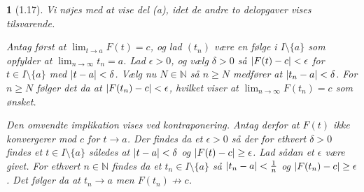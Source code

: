 \documentclass[a4paper, 11pt, article, danish, oneside]{memoir}
\newcommand{\naturals}{\mathbb{N}}
\newcommand{\blank}{\mathrel{\;\cdot\;}}
\newcommand{\blankifempty}[1]{\ifstrempty{#1}{\blank}{#1}}
\DeclarePairedDelimiter{\auxdelimlvert}{\lvert}{\rvert}
\newcommand{\abs}[1]{\auxdelimlvert{\blankifempty{#1}}}
\newcommand{\pencilsymbol}{\raisebox{-2pt}{\normalfont\PencilLeft}}
\theoremstyle{changedotcustomnumber}
\newtheorem{opgave}{\pencilsymbol}
\theoremstyle{changedotbreakcustomnumber}
\begin{document}
\begin{opgave}[1.17]
    Vi nøjes med at vise del (a), idet de andre to delopgaver vises tilsvarende.

    Antag først at $\lim_{t \to a} F(t) = c$, og lad $(t_n)$ være en følge i $I \setminus \{a\}$ som opfylder at $\lim_{n \to \infty} t_n = a$. Lad $\epsilon > 0$, og vælg $\delta > 0$ så $\abs{F(t) - c} < \epsilon$ for $t \in I \setminus \{a\}$ med $\abs{t - a} < \delta$. Vælg nu $N \in \naturals$ så $n \geq N$ medfører at $\abs{t_n - a} < \delta$. For $n \geq N$ følger det da at $\abs{F(t_n) - c} < \epsilon$, hvilket viser at $\lim_{n \to \infty} F(t_n) = c$ som ønsket.

    Den omvendte implikation vises ved kontraponering. Antag derfor at $F(t)$ \emph{ikke} konvergerer mod $c$ for $t \to a$. Der findes da et $\epsilon > 0$ så der for ethvert $\delta > 0$ findes et $t \in I \setminus \{a\}$ således at $\abs{t - a} < \delta$ og $\abs{F(t) - c} \geq \epsilon$. Lad sådan et $\epsilon$ være givet. For ethvert $n \in \naturals$ findes da et $t_n \in I \setminus \{a\}$ så $\abs{t_n - a} < \frac{1}{n}$ og $\abs{F(t_n) - c} \geq \epsilon$. Det følger da at $t_n \to a$ men $F(t_n) \not\to c$.
\end{opgave}
\end{document}
